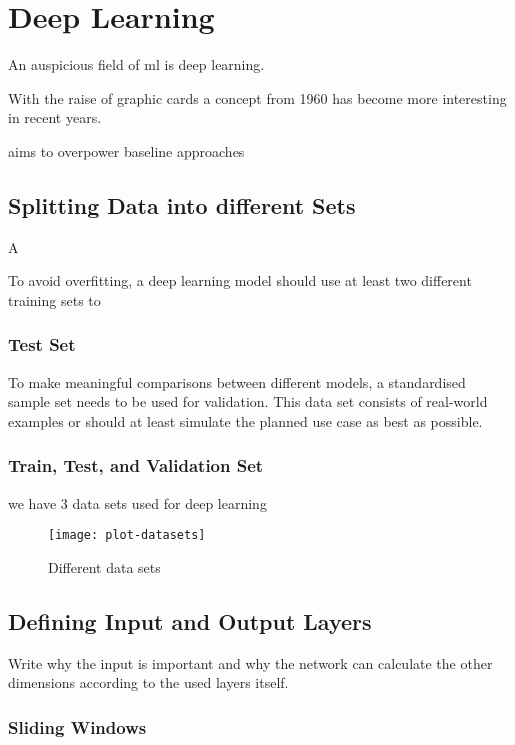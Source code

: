 \chapter{Deep Learning}

An auspicious field of \acrlong{ml} is deep learning.

With the raise of graphic cards a concept from 1960 has become more interesting in recent years.

aims to overpower baseline approaches

\section{Splitting Data into different Sets}

A 

To avoid overfitting, a deep learning model should use at least two different training sets to 

\subsection{Test Set}

To make meaningful comparisons between different models, a standardised sample set needs to be used for validation. This data set consists of real-world examples or should at least simulate the planned use case as best as possible.

\subsection{Train, Test, and Validation Set}

we have 3 data sets used for deep learning

\begin{figure}[!ht]
    \centering
    \texttt{[image: plot-datasets]}
    \caption{Different data sets}
    \label{fig:datasets}
\end{figure}

\section{Defining Input and Output Layers}

Write why the input is important and why the network can calculate the other dimensions according to the used layers itself.

\subsection{Sliding Windows}
\label{chap:sliding-window}

